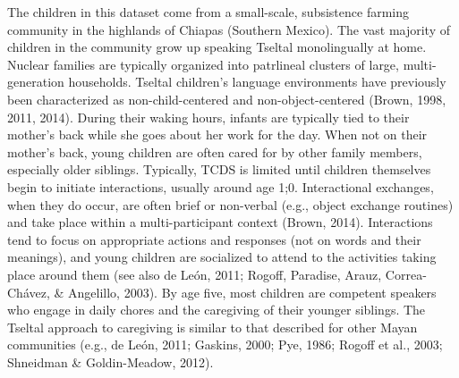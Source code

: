 \documentclass[floatsintext,man]{apa6}
\theoremstyle{definition}
\theoremstyle{definition}
\theoremstyle{definition}
\theoremstyle{remark}
\begin{document}
The children in this dataset come from a small-scale, subsistence
farming community in the highlands of Chiapas (Southern Mexico). The
vast majority of children in the community grow up speaking Tseltal
monolingually at home. Nuclear families are typically organized into
patrlineal clusters of large, multi-generation households. Tseltal
children's language environments have previously been characterized as
non-child-centered and non-object-centered (Brown, 1998, 2011, 2014).
During their waking hours, infants are typically tied to their mother's
back while she goes about her work for the day. When not on their
mother's back, young children are often cared for by other family
members, especially older siblings. Typically, TCDS is limited until
children themselves begin to initiate interactions, usually around age
1;0. Interactional exchanges, when they do occur, are often brief or
non-verbal (e.g., object exchange routines) and take place within a
multi-participant context (Brown, 2014). Interactions tend to focus on
appropriate actions and responses (not on words and their meanings), and
young children are socialized to attend to the activities taking place
around them (see also de León, 2011; Rogoff, Paradise, Arauz,
Correa-Chávez, \& Angelillo, 2003). By age five, most children are
competent speakers who engage in daily chores and the caregiving of
their younger siblings. The Tseltal approach to caregiving is similar to
that described for other Mayan communities (e.g., de León, 2011;
Gaskins, 2000; Pye, 1986; Rogoff et al., 2003; Shneidman \&
Goldin-Meadow, 2012).
\end{document}
